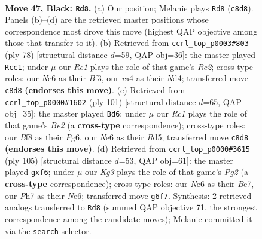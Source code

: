 \documentclass[11pt]{article}
\begin{document}
\clearpage

\begin{figure}[p]\centering
\begin{subfigure}{0.46\textwidth}\centering
\resizebox{\linewidth}{!}{%
\newchessgame
\chessboard[
  setfen={1rr2b2/7p/p2pn1k1/P3p1Pp/RpP1P3/1P3PR1/2K3B1/4B3 b - - 9 47},
  showmover=false,
  pgfstyle=straightmove, color=movearrow, markmove={c8-d8}
]}
\caption{}
\end{subfigure}\hfill
\begin{subfigure}{0.46\textwidth}\centering
\resizebox{\linewidth}{!}{%
\newchessgame
\chessboard[
  setfen={3r1k2/3b1p2/pb4pp/1prpP3/2pN1PPP/P3PB2/1PR2K2/7R w - - 11 40},
  showmover=false,
  pgfstyle=straightmove, color=movearrow, markmove={c2-c1}
]}
\caption{}
\end{subfigure}
\\[4pt]
\begin{subfigure}{0.46\textwidth}\centering
\resizebox{\linewidth}{!}{%
\newchessgame
\chessboard[
  setfen={8/p1r1b3/1p2k1p1/1P1rp2p/P1p1R3/2P2P1P/4K1P1/R3B3 b - - 2 51},
  showmover=false,
  pgfstyle=straightmove, color=movearrow, markmove={e7-d6}
]}
\caption{}
\end{subfigure}\hfill
\begin{subfigure}{0.46\textwidth}\centering
\resizebox{\linewidth}{!}{%
\newchessgame
\chessboard[
  setfen={6rr/2bk2p1/p1p1nPp1/Pp1p4/1P1P2RP/1KP4R/5P2/2BB4 b - - 0 53},
  showmover=false,
  pgfstyle=straightmove, color=movearrow, markmove={g7-f6}
]}
\caption{}
\end{subfigure}
\caption{\textbf{Move 47, Black: \texttt{Rd8}.} (a) Our position; Melanie plays \texttt{Rd8} (\texttt{c8d8}). Panels (b)--(d) are the retrieved master positions whose correspondence most drove this move (highest QAP objective among those that transfer to it). (b) Retrieved from \texttt{ccrl\_top\_p0003\#803} (ply 78) [structural distance $d$=59, QAP obj=36]: the master played \texttt{Rcc1}; under $\mu$ our \emph{Rc1} plays the role of that game's \emph{Rc2}; cross-type roles: our \emph{N}e6 as their \emph{B}f3, our \emph{r}a4 as their \emph{N}d4; transferred move \texttt{c8d8} \textbf{(endorses this move)}. (c) Retrieved from \texttt{ccrl\_top\_p0000\#1602} (ply 101) [structural distance $d$=65, QAP obj=35]: the master played \texttt{Bd6}; under $\mu$ our \emph{Rc1} plays the role of that game's \emph{Be2} (a \textbf{cross-type} correspondence); cross-type roles: our \emph{B}f8 as their \emph{P}g6, our \emph{N}e6 as their \emph{R}d5; transferred move \texttt{c8d8} \textbf{(endorses this move)}. (d) Retrieved from \texttt{ccrl\_top\_p0000\#3615} (ply 105) [structural distance $d$=53, QAP obj=61]: the master played \texttt{gxf6}; under $\mu$ our \emph{Kg3} plays the role of that game's \emph{Pg2} (a \textbf{cross-type} correspondence); cross-type roles: our \emph{N}e6 as their \emph{B}c7, our \emph{P}h7 as their \emph{N}e6; transferred move \texttt{g6f7}. Synthesis: 2 retrieved analogs transferred to \texttt{Rd8} (summed QAP objective 71, the strongest correspondence among the candidate moves); Melanie committed it via the \texttt{search} selector.}
\label{fig:thought-m93}
\end{figure}
\end{document}
